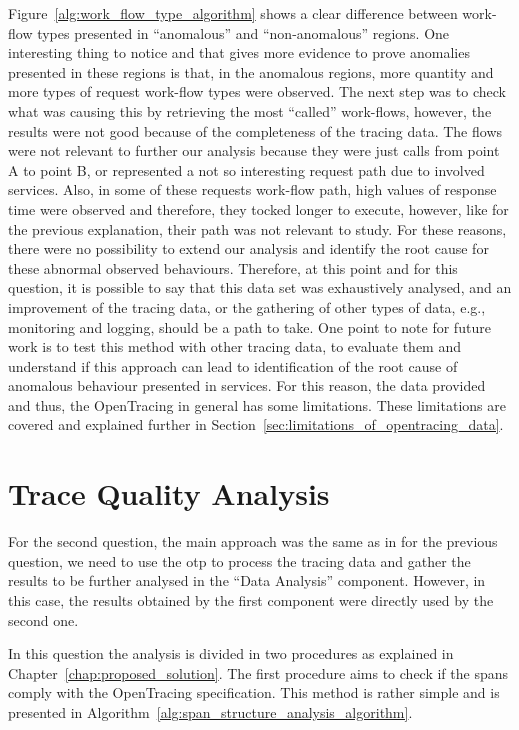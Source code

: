 Figure~\ref{alg:work_flow_type_algorithm} shows a clear difference between work-flow types presented in ``anomalous'' and ``non-anomalous'' regions. One interesting thing to notice and that gives more evidence to prove anomalies presented in these regions is that, in the anomalous regions, more quantity and more types of request work-flow types were observed. The next step was to check what was causing this by retrieving the most ``called'' work-flows, however, the results were not good because of the completeness of the tracing data. The flows were not relevant to further our analysis because they were just calls from point A to point B, or represented a not so interesting request path due to involved services. Also, in some of these requests work-flow path, high values of response time were observed and therefore, they tocked longer to execute, however, like for the previous explanation, their path was not relevant to study. For these reasons, there were no possibility to extend our analysis and identify the root cause for these abnormal observed behaviours. Therefore, at this point and for this question, it is possible to say that this data set was exhaustively analysed, and an improvement of the tracing data, or the gathering of other types of data, e.g., monitoring and logging, should be a path to take. One point to note for future work is to test this method with other tracing data, to evaluate them and understand if this approach can lead to identification of the root cause of anomalous behaviour presented in services. For this reason, the data provided and thus, the OpenTracing in general has some limitations. These limitations are covered and explained further in Section~\ref{sec:limitations_of_opentracing_data}.

\section{Trace Quality Analysis}
\label{sec:trace_quality_analysis}

For the second question, the main approach was the same as in for the previous question, we need to use the \gls{otp} to process the tracing data and gather the results to be further analysed in the ``Data Analysis'' component. However, in this case, the results obtained by the first component were directly used by the second one.

In this question the analysis is divided in two procedures as explained in Chapter~\ref{chap:proposed_solution}. The first procedure aims to check if the spans comply with the OpenTracing specification. This method is rather simple and is presented in Algorithm~\ref{alg:span_structure_analysis_algorithm}.

